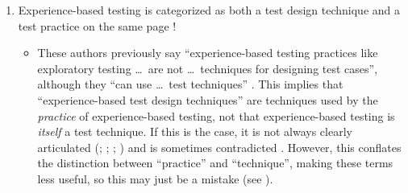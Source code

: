 \begin{enumerate}
      \item Experience-based testing is categorized as both a test design
            technique and a test practice on the same page
            \citep[pp.~22, 34]{IEEE2022}!
            \begin{itemize}
                  \item These authors previously say ``experience-based testing
                        practices like exploratory testing \dots\ are not
                        \dots\ techniques for designing test cases'', although
                        they ``can use \dots\ test techniques''
                        \citeyearpar[p.~viii]{IEEE2021}. This implies that
                        ``experience-based test design techniques'' are
                        techniques used by the \emph{practice} of experience-based
                        testing, not that experience-based testing is
                        \emph{itself} a test technique. If this is the case, it
                        is not always clearly articulated
                        (\citealp[pp.~4,~22]{IEEE2022}; \citeyear[p.~4]{IEEE2021};
                        \citealp[p.~5-13]{SWEBOK2024}; \citealpISTQB{}) and is
                        sometimes contradicted \citep[p.~46]{Firesmith2015}.
                        However, this conflates the distinction between
                        ``practice'' and ``technique'', making these terms less
                        useful, so this may just be a mistake
                        (see ).



\end{itemize}
\end{enumerate}
